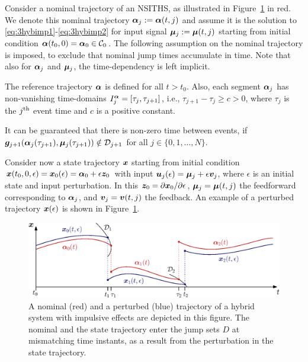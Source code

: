 \documentclass[../DC2017114Bouma.tex]{subfiles}
\begin{document}
Consider a nominal trajectory of an NSITHS, as illustrated in Figure~\ref{fig:3perturbedtraj} in red. We denote this nominal trajectory $\boldsymbol{\alpha}_j:=\boldsymbol{\alpha}(t,j)$ and assume it is the solution to \eqref{eq:3hybimp1}-\eqref{eq:3hybimp2} for input signal $\boldsymbol{\mu}_j:=\boldsymbol{\mu}(t,j)$ starting from initial condition $\boldsymbol{\alpha}(t_0,0)=\boldsymbol{\alpha}_0\in \mathcal{C}_0$. The following assumption on the nominal trajectory is imposed, to exclude that nominal jump times accumulate in time. Note that also for $\boldsymbol{\alpha}_j$ and $\boldsymbol{\mu}_j$, the time-dependency is left implicit.

\begin{sloppypar}
\begin{myass}
The reference trajectory $\boldsymbol{\alpha}$ is defined for all $t>t_0$. Also, each segment $\boldsymbol{\alpha}_j$ has non-vanishing time-domains $I^{\boldsymbol{\alpha}}_j=[\tau_j,\tau_{j+1}]$, i.e., $\tau_{j+1}-\tau_j\geq c > 0$, where $\tau_j$ is the $j^{\textnormal{th}}$ event time and $c$ is a positive constant.\label{ass:nonzeno}
\end{myass}
\end{sloppypar}

It can be guaranteed that there is non-zero time between events, if ${\boldsymbol{g}}_{j+1}(\boldsymbol{\alpha}_j(\tau_{j+1}),\boldsymbol{\mu}_j(\tau_{j+1}))\notin \mathcal{D}_{j+1}$ for all $j\in\{0,1,\dots,N\}$.

Consider now a state trajectory ${\boldsymbol{x}}$ starting from initial condition ${\boldsymbol{x}}(t_0,0,\epsilon)={\boldsymbol{x}}_0(\epsilon)=\boldsymbol{\alpha}_0+\epsilon {\boldsymbol{z}}_0$ with input ${\boldsymbol{u}}_j(\epsilon)=\boldsymbol{\mu}_j+\epsilon {\boldsymbol{v}}_j$, where $\epsilon$ is an initial state and input perturbation. In this ${\boldsymbol{z}}_0 = \partial{\boldsymbol{x}}_0 / \partial\epsilon$, $\boldsymbol{\mu}_j = \boldsymbol{\mu}(t,j)$ the feedforward corresponding to $\boldsymbol{\alpha}_j$, and ${\boldsymbol{v}}_j = {\boldsymbol{v}}(t,j)$ the feedback. An example of a perturbed trajectory ${\boldsymbol{x}}(\epsilon)$ is shown in Figure~\ref{fig:3perturbedtraj}.

%
%
\begin{figure}[h]
\centering
\includegraphics[width=.9\textwidth]{perturbedtraj.eps}\caption{A nominal (red) and a perturbed (blue) trajectory of a hybrid system with impulsive effects are depicted in this figure. The nominal and the state trajectory enter the jump sets $D$ at mismatching time instants, as a result from the perturbation in the state trajectory.} \label{fig:3perturbedtraj}
\end{figure}
\end{document}
